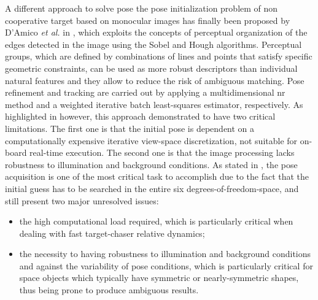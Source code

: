 A different approach to solve pose the pose initialization problem of non cooperative target based on monocular images has finally been proposed by D'Amico \textit{et al.} in \cite{D2014}, which exploits the concepts of perceptual organization \cite{Lowe1987} of the edges detected in the image using the Sobel and Hough algorithms. Perceptual groups, which are defined by combinations of lines and points that satisfy specific geometric constraints, can be used as more robust descriptors than individual natural features and they allow  to reduce the risk of ambiguous matching. Pose refinement and tracking are carried out by applying a multidimensional \acrfull{nr} method and a weighted iterative batch least-squares estimator, respectively. As highlighted in \cite{2019phdSharma} however, this approach demonstrated to have two critical limitations. The first one is that the initial pose is dependent on a computationally expensive iterative view-space discretization, not suitable for on-board real-time execution. The second one is that the image processing lacks robustness to illumination and background conditions.
As stated in \cite{Opromolla2017}, the pose acquisition is one of the most critical task to accomplish due to the fact that the initial guess has to be searched in the entire six degrees-of-freedom-space, and still present two major unresolved issues:

\begin{itemize}
  \item the high computational load required, which is particularly critical when dealing with fast target-chaser relative dynamics;
  \item the necessity to having robustness to illumination and background conditions and against the variability of pose conditions, which is particularly critical for space objects which typically have symmetric or nearly-symmetric shapes, thus being prone to produce ambiguous results.
\end{itemize}
